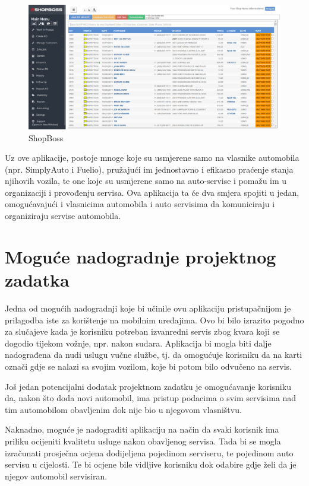 		\begin{figure}[H]
			\includegraphics[scale=0.3]{slike/shopboss.PNG}
			\centering
			\caption{ShopBoss}
			\label{fig:shopboss}
		\end{figure}
		
		Uz ove aplikacije, postoje mnoge koje su usmjerene samo na vlasnike automobila (npr. SimplyAuto i Fuelio), pružajući im jednostavno i efikasno praćenje stanja njihovih vozila, te one koje su usmjerene samo na auto-servise i pomažu im u organizaciji i provođenju servisa. Ova aplikacija ta će dva smjera spojiti u jedan, omogućavajući i vlasnicima automobila i auto servisima da komuniciraju i organiziraju servise automobila. \\
		
		\section{Moguće nadogradnje projektnog zadatka}
		
		\normalsize Jedna od mogućih nadogradnji koje bi učinile ovu aplikaciju pristupačnijom je prilagodba iste za korištenje na mobilnim uređajima. Ovo bi bilo izrazito pogodno za slučajeve kada je korisniku potreban izvanredni servis zbog kvara koji se dogodio tijekom vožnje, npr. nakon sudara. Aplikacija bi mogla biti dalje nadograđena da nudi uslugu vučne službe, tj. da omogućuje korisniku da na karti označi gdje se nalazi sa svojim vozilom, koje bi potom bilo odvučeno na servis.
		
		Još jedan potencijalni dodatak projektnom zadatku je omogućavanje korisniku da, nakon što doda novi automobil, ima pristup podacima o svim servisima nad tim automobilom obavljenim dok nije bio u njegovom vlasništvu.
		
		Naknadno, moguće je nadograditi aplikaciju na način da svaki korisnik ima priliku ocijeniti kvalitetu usluge nakon obavljenog servisa. Tada bi se mogla izračunati prosječna ocjena dodijeljena pojedinom serviseru, te pojedinom auto servisu u cijelosti. Te bi ocjene bile vidljive korisniku dok odabire gdje želi da je njegov automobil servisiran.
		
